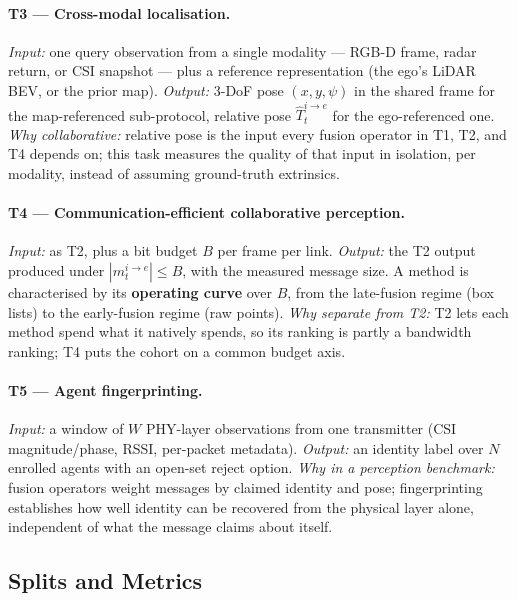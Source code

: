 \paragraph{T3 --- Cross-modal localisation.}
\emph{Input:} one query observation from a single modality --- RGB-D frame,
radar return, or CSI snapshot --- plus a reference representation (the ego's
LiDAR BEV, or the prior map). \emph{Output:} 3-DoF pose $(x, y, \psi)$ in the
shared frame for the map-referenced sub-protocol, relative pose
$\hat{T}^{i \to e}_t$ for the ego-referenced one. \emph{Why collaborative:}
relative pose is the input every fusion operator in T1, T2, and T4 depends on;
this task measures the quality of that input in isolation, per modality,
instead of assuming ground-truth extrinsics.

\paragraph{T4 --- Communication-efficient collaborative perception.}
\emph{Input:} as T2, plus a bit budget $B$ per frame per link.
\emph{Output:} the T2 output produced under $|m^{i \to e}_t| \leq B$, with the
measured message size. A method is characterised by its \textbf{operating
curve} over $B$, from the late-fusion regime (box lists) to the early-fusion
regime (raw points). \emph{Why separate from T2:} T2 lets each method spend
what it natively spends, so its ranking is partly a bandwidth ranking; T4 puts
the cohort on a common budget axis.

\paragraph{T5 --- Agent fingerprinting.}
\emph{Input:} a window of $W$ PHY-layer observations from one transmitter
(CSI magnitude/phase, RSSI, per-packet metadata). \emph{Output:} an identity
label over $N$ enrolled agents with an open-set reject option.
\emph{Why in a perception benchmark:} fusion operators weight messages by
claimed identity and pose; fingerprinting establishes how well identity can be
recovered from the physical layer alone, independent of what the message claims
about itself.

\subsection{Splits and Metrics}
\label{sec:bench:splits}

